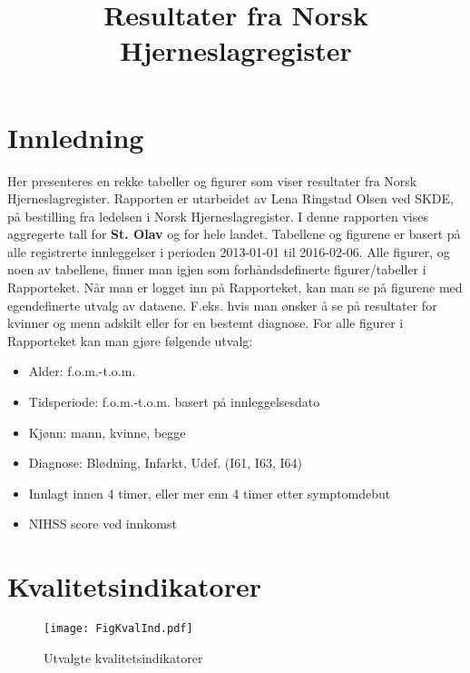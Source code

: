 \documentclass [norsk,a4paper,twoside]{article}\usepackage[]{graphicx}\usepackage[]{color}
\title{Resultater fra Norsk Hjerneslagregister}
\begin{document}
\maketitle
\tableofcontents
\listoffigures
\listoftables
\newpage









\section{Innledning}
Her presenteres en rekke tabeller og figurer som viser resultater fra Norsk Hjerneslagregister.
Rapporten er utarbeidet av Lena Ringstad Olsen ved SKDE, på bestilling fra ledelsen i Norsk Hjerneslagregister.
I denne rapporten vises aggregerte tall for \textbf{St. Olav} og for hele landet. 
Tabellene og figurene er basert
på alle registrerte innleggelser i perioden 2013-01-01 til 2016-02-06. 
Alle figurer, og noen av tabellene, finner man igjen som forhåndsdefinerte figurer/tabeller 
i Rapporteket. Når man er logget inn på Rapporteket, kan man se på figurene med egendefinerte 
utvalg av dataene. F.eks. hvis man
ønsker å se på resultater for kvinner og menn adskilt eller for en bestemt diagnose.
For alle figurer i Rapporteket kan man gjøre følgende utvalg:
\begin{itemize}
	\item Alder: f.o.m.-t.o.m.
	\item Tidsperiode: f.o.m.-t.o.m. basert på innleggelsesdato
	\item Kjønn: mann, kvinne, begge 
	\item Diagnose: Blødning, Infarkt, Udef. (I61, I63, I64)
	\item Innlagt innen 4 timer, eller mer enn 4 timer etter symptomdebut
	\item NIHSS score ved innkomst
\end{itemize}


\clearpage
\section{Kvalitetsindikatorer}

\begin{figure}[ht]
{\centering \texttt{[image: FigKvalInd.pdf]} }
\caption{\label{fig:KvalInd} Utvalgte kvalitetsindikatorer}
\end{figure}
\end{document}
